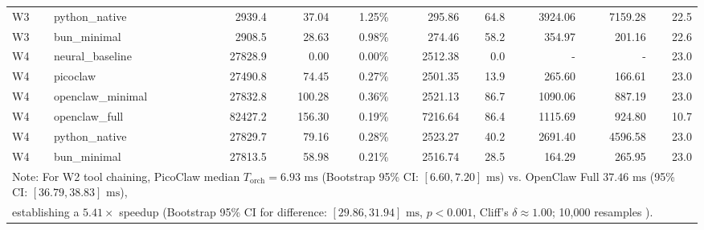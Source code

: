\begin{table}[t]
\begin{tabular}{llrrrrrrrr}
W3 & python\_native & 2939.4 & 37.04 & 1.25\% & 295.86 & 64.8 & 3924.06 & 7159.28 & 22.5 \\
W3 & bun\_minimal & 2908.5 & 28.63 & 0.98\% & 274.46 & 58.2 & 354.97 & 201.16 & 22.6 \\
\midrule
W4 & neural\_baseline & 27828.9 & 0.00 & 0.00\% & 2512.38 & 0.0 & - & - & 23.0 \\
W4 & picoclaw & 27490.8 & 74.45 & 0.27\% & 2501.35 & 13.9 & 265.60 & 166.61 & 23.0 \\
W4 & openclaw\_minimal & 27832.8 & 100.28 & 0.36\% & 2521.13 & 86.7 & 1090.06 & 887.19 & 23.0 \\
W4 & openclaw\_full & 82427.2 & 156.30 & 0.19\% & 7216.64 & 86.4 & 1115.69 & 924.80 & 10.7 \\
W4 & python\_native & 27829.7 & 79.16 & 0.28\% & 2523.27 & 40.2 & 2691.40 & 4596.58 & 23.0 \\
W4 & bun\_minimal & 27813.5 & 58.98 & 0.21\% & 2516.74 & 28.5 & 164.29 & 265.95 & 23.0 \\
\midrule
\multicolumn{10}{l}{\footnotesize Note: For W2 tool chaining, PicoClaw median $T_{\text{orch}} = 6.93\text{ ms}$ (Bootstrap 95\% CI: $[6.60, 7.20]\text{ ms}$) vs. OpenClaw Full $37.46\text{ ms}$ (95\% CI: $[36.79, 38.83]\text{ ms}$),} \\
\multicolumn{10}{l}{\footnotesize establishing a $5.41\times$ speedup (Bootstrap 95\% CI for difference: $[29.86, 31.94]\text{ ms}$, $p < 0.001$, Cliff's $\delta \approx 1.00$; 10,000 resamples \cite{efron1979}).} \\
\bottomrule
\end{tabular}
\end{table}
